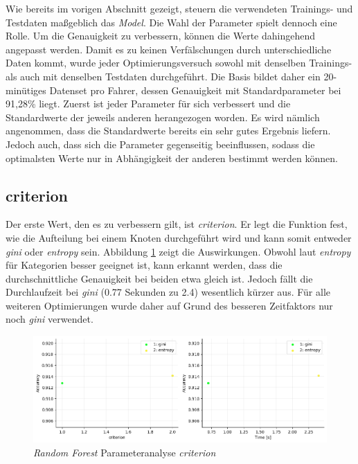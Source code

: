 Wie bereits im vorigen Abschnitt gezeigt, steuern die verwendeten Trainings- und Testdaten maßgeblich das \textit{Model}. Die Wahl der Parameter spielt dennoch eine Rolle. Um die Genauigkeit zu verbessern, können die Werte dahingehend angepasst werden. Damit es zu keinen Verfälschungen durch unterschiedliche Daten kommt, wurde jeder Optimierungsversuch sowohl mit denselben Trainings- als auch mit denselben Testdaten durchgeführt. Die Basis bildet daher ein 20-minütiges Datenset pro Fahrer, dessen Genauigkeit mit Standardparameter bei 91,28\% liegt. Zuerst ist jeder Parameter für sich verbessert und die Standardwerte der jeweils anderen herangezogen worden. Es wird nämlich angenommen, dass die Standardwerte bereits ein sehr gutes Ergebnis liefern. Jedoch auch, dass sich die Parameter gegenseitig beeinflussen, sodass die optimalsten Werte nur in Abhängigkeit der anderen bestimmt werden können.

\subsection{criterion}

Der erste Wert, den es zu verbessern gilt, ist \textit{criterion}. Er legt die Funktion fest, wie die Aufteilung bei einem Knoten durchgeführt wird und kann somit entweder \textit{gini} oder \textit{entropy} sein. Abbildung \ref{fig:rf_criterion} zeigt die Auswirkungen. Obwohl laut \cite{Rebala2019} \textit{entropy} für Kategorien besser geeignet ist, kann erkannt werden, dass die durchschnittliche Genauigkeit bei beiden etwa gleich ist. Jedoch fällt die Durchlaufzeit bei \textit{gini} (0.77 Sekunden zu 2.4) wesentlich kürzer aus. Für alle weiteren Optimierungen wurde daher auf Grund des besseren Zeitfaktors nur noch \textit{gini} verwendet.

\begin{figure}[htbp]
	\centering
	\includegraphics[width=\textwidth]{images/criterion_time.png}
	\caption{\textit{Random Forest} Parameteranalyse \textit{criterion}}
	\label{fig:rf_criterion}
\end{figure}

